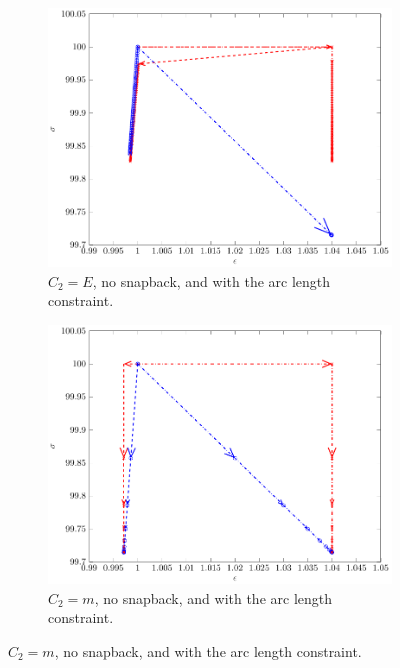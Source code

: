 \documentclass[10pt]{elsarticle}
\begin{document}
\begin{figure}[]
\begin{subfigure}{0.45\textwidth}
		\centering
		\includegraphics[scale=0.7]{./conv_figs/bad_metric_no_snap_arc_length.pdf}
		\caption{$C_2=E$, no snapback, and with the arc length constraint.}
		\label{bad_metric_no_snap_arc_length}
	\end{subfigure}
	\hfill
	\begin{subfigure}{0.45\textwidth}
		\centering
		\includegraphics[scale=0.7]{./conv_figs/good_metric_no_snap_arc_length.pdf}
		\caption{$C_2=m$, no snapback, and with the arc length constraint.}
		\label{good_metric_no_snap_arc_length}
	\end{subfigure}
\end{figure}
\end{document}
